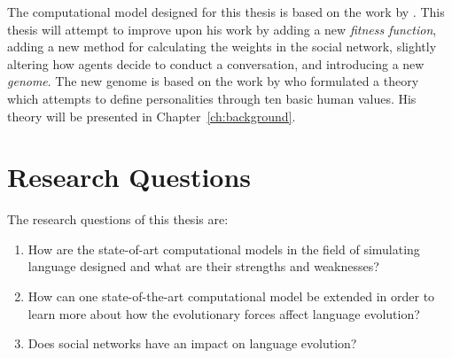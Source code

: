 The computational model designed for this thesis is based on the work by \citeauthor{lekvam2014co}. This thesis will attempt to improve upon his work by adding a new \textit{fitness function}, adding a new method for calculating the weights in the social network, slightly altering how agents decide to conduct a conversation, and introducing a new \textit{genome}. The new genome is based on the work by \citeauthor{schwartz1992unniversals} who formulated a theory which attempts to define personalities through ten basic human values. His theory will be presented in Chapter~\ref{ch:background}.


    \section{Research Questions}
    The research questions of this thesis are:
    
    \begin{centering}
        \begin{enumerate}
            \item How are the state-of-art computational models in the field of simulating language designed and what are their strengths and weaknesses?
            \item How can one state-of-the-art computational model be extended in order to learn more about how the evolutionary forces affect language evolution?
            \item Does social networks have an impact on language evolution? 
        \end{enumerate}
    \end{centering}

